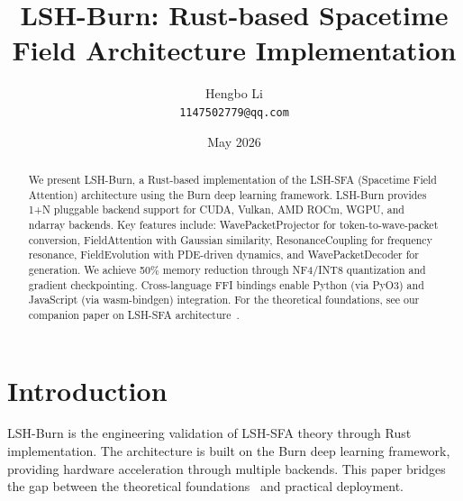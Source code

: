 \documentclass{article}
\title{LSH-Burn: Rust-based Spacetime Field Architecture Implementation}
\author{Hengbo Li\\
\texttt{1147502779@qq.com}
}
\date{May 2026}
\begin{document}
\maketitle

\begin{abstract}
We present LSH-Burn, a Rust-based implementation of the LSH-SFA (Spacetime Field Attention) architecture using the Burn deep learning framework. LSH-Burn provides 1+N pluggable backend support for CUDA, Vulkan, AMD ROCm, WGPU, and ndarray backends. Key features include: WavePacketProjector for token-to-wave-packet conversion, FieldAttention with Gaussian similarity, ResonanceCoupling for frequency resonance, FieldEvolution with PDE-driven dynamics, and WavePacketDecoder for generation. We achieve 50\% memory reduction through NF4/INT8 quantization and gradient checkpointing. Cross-language FFI bindings enable Python (via PyO3) and JavaScript (via wasm-bindgen) integration. For the theoretical foundations, see our companion paper on LSH-SFA architecture~\cite{lsh-sfa}.
\end{abstract}

\section{Introduction}

LSH-Burn is the engineering validation of LSH-SFA theory through Rust implementation. The architecture is built on the Burn deep learning framework, providing hardware acceleration through multiple backends. This paper bridges the gap between the theoretical foundations~\cite{lsh-sfa, encoding-gradient} and practical deployment.
\end{document}
